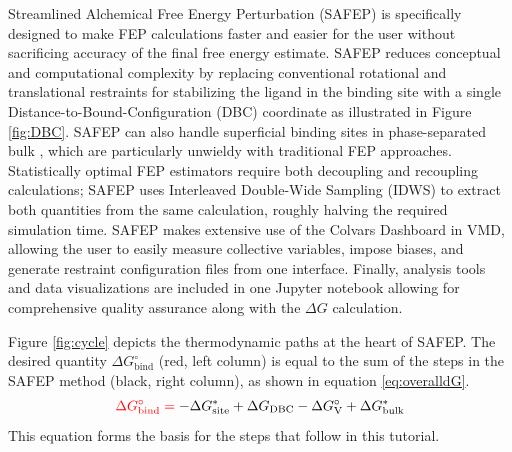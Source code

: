 \documentclass[9pt,tutorial]{Styling/livecoms}
\begin{document}
Streamlined Alchemical Free Energy Perturbation (SAFEP) is specifically designed to make FEP calculations faster and easier for the user without sacrificing accuracy of the final free energy estimate.
SAFEP reduces conceptual and computational complexity by replacing conventional rotational and translational restraints for stabilizing the ligand in the binding site with a single Distance-to-Bound-Configuration (DBC) coordinate as illustrated in Figure \ref{fig:DBC}.
SAFEP can also handle superficial binding sites in phase-separated bulk \cite{Salari2018}, which are particularly unwieldy with traditional FEP approaches. 
Statistically optimal FEP estimators require both decoupling and recoupling calculations; SAFEP uses Interleaved Double-Wide Sampling (IDWS) to extract both quantities from the same calculation, roughly halving the required simulation time. 
SAFEP makes extensive use of the Colvars Dashboard in VMD, allowing the user to easily measure collective variables, impose biases, and generate restraint configuration files from one interface. 
Finally, analysis tools and data visualizations are included in one Jupyter notebook allowing for comprehensive quality assurance along with the $\Delta G$ calculation.

Figure \ref{fig:cycle} depicts the thermodynamic paths at the heart of SAFEP. 
The desired quantity $\Delta G^\circ_\mathrm{bind}$ (red, left column) is equal to the sum of the steps in the SAFEP method (black, right column), as shown in equation \ref{eq:overalldG}. 
\begin{equation}\label{eq:overalldG}
    \color{red} \Delta G^\circ_\mathrm{bind} = \color{black} - \Delta G_\mathrm{site}^* + \Delta G_\mathrm{DBC} - \Delta G^\circ_\mathrm{V} + \Delta G^*_\mathrm{bulk} 
\end{equation}
\noindent This equation forms the basis for the steps that follow in this tutorial. 
\end{document}
